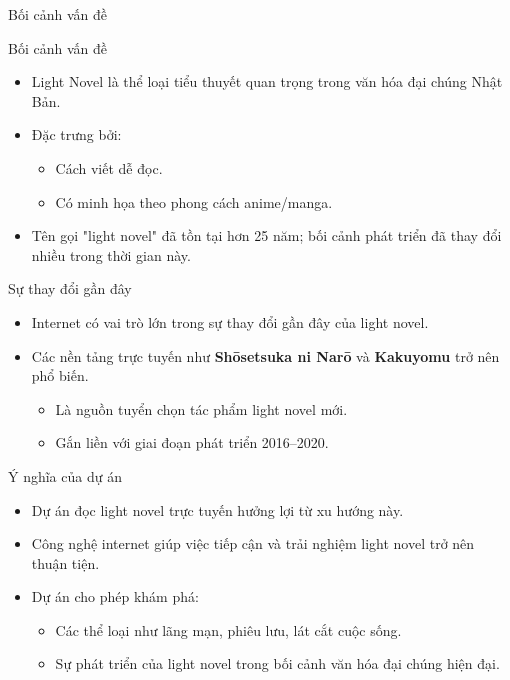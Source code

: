 \documentclass[12pt,aspectratio=169,handout]{beamer}
\begin{document}
\begin{frame}[allowframebreaks]{Bối cảnh vấn đề}
    \begin{block}{Bối cảnh vấn đề}
    \begin{itemize}
        \item Light Novel là thể loại tiểu thuyết quan trọng trong văn hóa đại chúng Nhật Bản.
        \item Đặc trưng bởi:
        \begin{itemize}
            \item Cách viết dễ đọc.
            \item Có minh họa theo phong cách anime/manga.
        \end{itemize}
        \item Tên gọi "light novel" đã tồn tại hơn 25 năm; bối cảnh phát triển đã thay đổi nhiều trong thời gian này. \cite{gong2022gender,hasegawa2023statistical}
    \end{itemize}
    \end{block}

    \begin{block}{Sự thay đổi gần đây}
    \begin{itemize}
        \item Internet có vai trò lớn trong sự thay đổi gần đây của light novel.
        \item Các nền tảng trực tuyến như \textbf{Shōsetsuka ni Narō} và \textbf{Kakuyomu} trở nên phổ biến.
        \begin{itemize}
            \item Là nguồn tuyển chọn tác phẩm light novel mới.
            \item Gắn liền với giai đoạn phát triển 2016–2020. \cite{hasegawa2023statistical}
        \end{itemize}
    \end{itemize}
    \end{block}

    \begin{block}{Ý nghĩa của dự án}
        \begin{itemize}
            \item Dự án đọc light novel trực tuyến hưởng lợi từ xu hướng này.
            \item Công nghệ internet giúp việc tiếp cận và trải nghiệm light novel trở nên thuận tiện.
            \item Dự án cho phép khám phá:
            \begin{itemize}
                \item Các thể loại như lãng mạn, phiêu lưu, lát cắt cuộc sống.
                \item Sự phát triển của light novel trong bối cảnh văn hóa đại chúng hiện đại.
            \end{itemize}
        \end{itemize}
    \end{block}
\end{frame}
\end{document}
